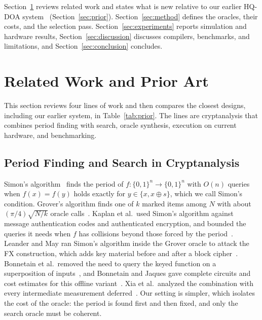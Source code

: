 \documentclass[journal]{IEEEtran}
\begin{document}
Section~\ref{sec:related} reviews related work and states what is new relative
to our earlier HQ-DOA system~\cite{patil2026quantum} (Section~\ref{sec:prior}).
Section~\ref{sec:method} defines the oracles, their costs, and the selection pass.
Section~\ref{sec:experiments} reports simulation and hardware results,
Section~\ref{sec:discussion} discusses compilers, benchmarks, and limitations,
and Section~\ref{sec:conclusion} concludes.

\section{Related Work and Prior Art}
\label{sec:related}

This section reviews four lines of work and then compares the closest designs,
including our earlier system, in Table~\ref{tab:prior}. The lines are
cryptanalysis that combines period finding with search, oracle synthesis,
execution on current hardware, and benchmarking.

\subsection{Period Finding and Search in Cryptanalysis}

Simon's algorithm~\cite{simon1994power} finds the period of
$f:\{0,1\}^n\to\{0,1\}^n$ with $O(n)$ queries when $f(x)=f(y)$ holds exactly
for $y\in\{x,x\oplus s\}$, which we call Simon's condition. Grover's algorithm
finds one of $k$ marked items
among $N$ with about $(\pi/4)\sqrt{N/k}$ oracle
calls~\cite{grover1996fast,boyer1998tight}. Kaplan et al.\ used Simon's algorithm
against message authentication codes and authenticated encryption, and bounded
the queries it needs when $f$ has collisions beyond those forced by the
period~\cite{kaplan2016breaking}. Leander and May ran Simon's algorithm inside
the Grover oracle to attack the FX construction, which adds key material before
and after a block cipher~\cite{leander2017grover}. Bonnetain et al.\ removed the
need to query the keyed function on a superposition of
inputs~\cite{bonnetain2019quantum}, and Bonnetain and Jaques gave complete
circuits and cost estimates for this offline
variant~\cite{bonnetain2022quantum}. Xia et al.\ analyzed the combination with
every intermediate measurement deferred~\cite{xia2025tight}. Our setting is
simpler, which isolates the cost of the oracle: the period is found first and
then fixed, and only the search oracle must be coherent.
\end{document}
